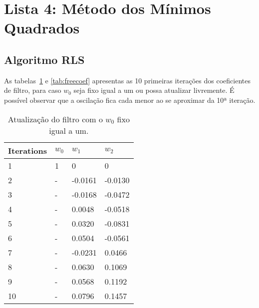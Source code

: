 \section{Lista 4: Método dos Mínimos Quadrados} %

\subsection{Algoritmo RLS} %
As tabelas~\ref{tab:fixcoef} e \ref{tab:freecoef} apresentas as 10 primeiras iterações dos coeficientes de filtro, para caso $w_0$ seja fixo igual a um ou possa atualizar livremente. É possível observar que a oscilação fica cada menor ao se aproximar da 10ª iteração.

\begin{table}[!htp]
    \centering
    \begin{tabular}{ l l l l }
        \hline
        Iterations & $w_{0}$ & $w_{1}$ & $w_{2}$ \\ 
        \hline 
        1 & 1 & 0 & 0 \\ \hline
        2 & - & -0.0161 & -0.0130 \\ \hline
        3 & - & -0.0168 & -0.0472 \\ \hline
        4 & - & 0.0048 & -0.0518 \\ \hline
        5 & - & 0.0320 & -0.0831 \\ \hline
        6 & - & 0.0504 & -0.0561 \\ \hline
        7 & - & -0.0231 & 0.0466 \\ \hline
        8 & - & 0.0630 & 0.1069 \\ \hline
        9 & - & 0.0568 & 0.1192 \\ \hline
        10 & - & 0.0796 & 0.1457 \\ \hline
    \end{tabular}
    \caption{Atualização do filtro com o $w_0$ fixo igual a um.}
    \label{tab:fixcoef}
\end{table}

